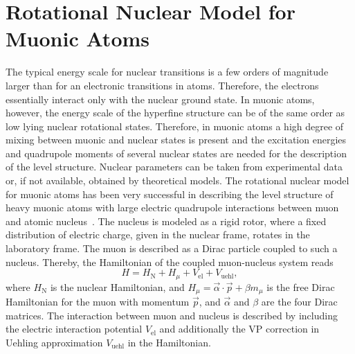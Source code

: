 \section{Rotational Nuclear Model for \\Muonic Atoms}
The typical energy scale for nuclear transitions is a few orders
of magnitude larger than for an electronic transitions
in atoms. Therefore, the electrons essentially interact only
with the nuclear ground state. In muonic atoms, however, the energy scale of the hyperfine structure can be of the same order as low lying nuclear rotational states.
Therefore, in muonic atoms a high degree of
mixing between muonic and nuclear states is present and the excitation energies and quadrupole moments of several nuclear states are needed for the description of the level structure. Nuclear parameters can be taken from experimental data or, if not available, obtained by theoretical models. The rotational nuclear model for muonic atoms has been very successful in describing the level structure of heavy muonic atoms with large electric quadrupole interactions between muon and atomic nucleus~\cite{tanaka1984,hitlin1970,wu1969,Devons1995}. The nucleus is modeled as a rigid rotor, where a fixed distribution of electric charge, given in the nuclear frame, rotates in the laboratory frame. The muon is described as a Dirac particle coupled to such a nucleus. Thereby, the Hamiltonian of the coupled muon-nucleus system reads
\begin{equation}
H = H_{\text{N}} + H_\mu + V_{\text{el}} + V_{\text{uehl}},
\label{eq:htot}
\end{equation}
where $H_{\text{N}}$ is the nuclear Hamiltonian, and ${H_\mu}{=}{\vec{\alpha} \cdot \vec{p} + \beta m_\mu}$ is the free Dirac Hamiltonian for the muon with momentum $\vec{p}$, and $\vec{\alpha}$ and $\beta$ are the four Dirac matrices. 
The interaction between muon and nucleus is described by including the electric interaction potential $V_{\text{el}}$ and additionally the VP correction in Uehling approximation $V_{\text{uehl}}$ in the Hamiltonian.


